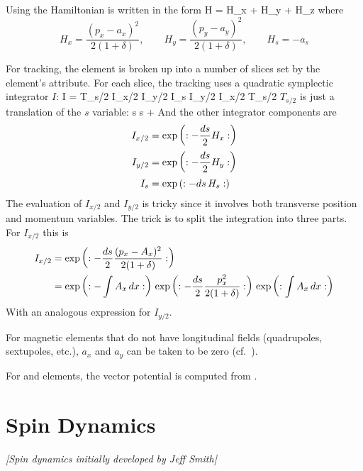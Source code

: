 Using  the Hamiltonian is written in the form
\Begineq
  H = H_x + H_y + H_z
\Endeq
where
\begin{equation}
  H_x = \frac{(p_x - a_x)^2}{2 (1 + \delta)}, \qquad
  H_y = \frac{(p_y - a_y)^2}{2 (1 + \delta)}, \qquad
  H_s = - a_s 
\end{equation}

For tracking, the element is broken up into a number of slices set by
the element's  attribute. For each slice, the tracking
uses a quadratic symplectic integrator $I$:
\Begineq
  I = T_{s/2} \; I_{x/2} \; I_{y/2} \; I_s \; I_{y/2} \; I_{x/2} \; T_{s/2}
\Endeq
$T_{s/2}$ is just a translation of the $s$ variable:
\Begineq
  s \rightarrow s + 
\Endeq
And the other integrator components are
\begin{align}
  I_{x/2} &= \exp \left( : -\frac{ds}{2} H_x : \right) \nonumber \\
  I_{y/2} &= \exp \left( : -\frac{ds}{2} H_y : \right) \\
  I_{s}   &= \exp \left( : -ds \, H_s : \right) \nonumber
\end{align}
The evaluation of $I_{x/2}$ and $I_{y/2}$ is tricky since it involves both transverse
position and momentum variables. The trick is to split the integration into three parts.
For $I_{x/2}$ this is
\begin{align}
  I_{x/2} &= \exp \left( : -\frac{ds}{2} \frac{(p_x - A_x)^2}{2 (1 + \delta)} : \right) \nonumber \\
  &= \exp \left( : -\int A_x \, dx : \right) \,
     \exp \left( : -\frac{ds}{2} \frac{p_x^2}{2 (1 + \delta)} : \right) \,
     \exp \left( : \int A_x \, dx : \right)
  \label{ids2}
\end{align}
With an analogous expression for $I_{y/2}$.

For magnetic elements that do not have longitudinal fields
(quadrupoles, sextupoles, etc.), $a_x$ and $a_y$ can be taken to be
zero (cf.~).

For  and  elements, the vector potential is computed from
.

\section{Spin Dynamics}   
\label{s:spin.dyn}   

\textit{\large [Spin dynamics initially developed by Jeff Smith]}

